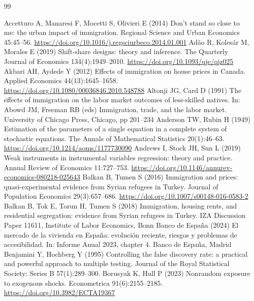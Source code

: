 \renewcommand{\refname}{References}
\begin{thebibliography}{99}\small\setlength{\itemsep}{2pt}\raggedright
{} Accetturo A, Manaresi F, Mocetti S, Olivieri E (2014) Don't stand so close to me: the urban impact of immigration. Regional Science and Urban Economics 45:45--56. \url{https://doi.org/10.1016/j.regsciurbeco.2014.01.001}
 Adão R, Kolesár M, Morales E (2019) Shift-share designs: theory and inference. The Quarterly Journal of Economics 134(4):1949--2010. \url{https://doi.org/10.1093/qje/qjz025}
 Akbari AH, Aydede Y (2012) Effects of immigration on house prices in Canada. Applied Economics 44(13):1645--1658. \url{https://doi.org/10.1080/00036846.2010.548788}
 Altonji JG, Card D (1991) The effects of immigration on the labor market outcomes of less-skilled natives. In: Abowd JM, Freeman RB (eds) Immigration, trade, and the labor market. University of Chicago Press, Chicago, pp 201--234
 Anderson TW, Rubin H (1949) Estimation of the parameters of a single equation in a complete system of stochastic equations. The Annals of Mathematical Statistics 20(1):46--63. \url{https://doi.org/10.1214/aoms/1177730090}
 Andrews I, Stock JH, Sun L (2019) Weak instruments in instrumental variables regression: theory and practice. Annual Review of Economics 11:727--753. \url{https://doi.org/10.1146/annurev-economics-080218-025643}
 Balkan B, Tumen S (2016) Immigration and prices: quasi-experimental evidence from Syrian refugees in Turkey. Journal of Population Economics 29(3):657--686. \url{https://doi.org/10.1007/s00148-016-0583-2}
 Balkan B, Tok E, Torun H, Tumen S (2018) Immigration, housing rents, and residential segregation: evidence from Syrian refugees in Turkey. IZA Discussion Paper 11611, Institute of Labor Economics, Bonn
 Banco de España (2024) El mercado de la vivienda en España: evolución reciente, riesgos y problemas de accesibilidad. In: Informe Anual 2023, chapter 4. Banco de España, Madrid
 Benjamini Y, Hochberg Y (1995) Controlling the false discovery rate: a practical and powerful approach to multiple testing. Journal of the Royal Statistical Society: Series B 57(1):289--300.
 Borusyak K, Hull P (2023) Nonrandom exposure to exogenous shocks. Econometrica 91(6):2155--2185. \url{https://doi.org/10.3982/ECTA19367}

\end{thebibliography}

